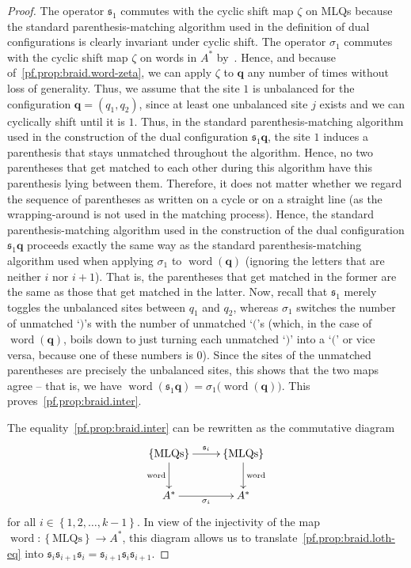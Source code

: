 \documentclass[reqno]{amsart}
\newcommand{\0}{\phantom{c}}
\DeclareMathOperator{\word}{word} %
\newcommand{\qq}{\mathbf{q}}
\newcommand{\fraks}{\mathfrak{s}}
\newcommand{\set}[1]{\left\{ #1 \right\}}
\theoremstyle{plain}
\theoremstyle{definition}
\numberwithin{equation}{section}
\begin{document}
\begin{proof}
The operator $\fraks_1$ commutes with the cyclic shift map $\zeta$ on MLQs because the standard parenthesis-matching algorithm used in the definition of dual configurations is clearly invariant under cyclic shift.
The operator $\sigma_1$ commutes with the cyclic shift map $\zeta$ on words in $A^*$ by~\cite[Prop.~5.6.1]{Loth}.
Hence, and because of~\eqref{pf.prop:braid.word-zeta}, we can apply $\zeta$ to $\qq$ any number of times without loss of generality.
Thus, we assume that the site $1$ is unbalanced for the configuration $\qq = (q_1, q_2)$, since at least one unbalanced site $j$ exists and we can cyclically shift until it is $1$.
Thus, in the standard parenthesis-matching algorithm used in the construction of the dual configuration $\fraks_1 \qq$, the site $1$ induces a parenthesis that stays unmatched throughout the algorithm.
Hence, no two parentheses that get matched to each other during this algorithm have this parenthesis lying between them.
Therefore, it does not matter whether we regard the sequence of parentheses as written on a cycle or on a straight line (as the wrapping-around is not used in the matching process).
Hence, the standard parenthesis-matching algorithm used in the construction of the dual configuration $\fraks_1 \qq$ proceeds exactly the same way as the standard parenthesis-matching algorithm used when applying $\sigma_1$ to $\word(\qq)$ (ignoring the letters that are neither $i$ nor $i+1$). That is, the parentheses that get matched in the former are the same as those that get matched in the latter.
Now, recall that $\fraks_1$ merely toggles the unbalanced sites between $q_1$ and $q_2$, whereas $\sigma_1$ switches the number of unmatched `$)$'s with the number of unmatched `$($'s (which, in the case of $\word(\qq)$, boils down to just turning each unmatched `$)$' into a `$($' or vice versa, because one of these numbers is $0$).
Since the sites of the unmatched parentheses are precisely the unbalanced sites, this shows that the two maps agree -- that is, we have $\word(\fraks_1 \qq) = \sigma_1\bigl( \word(\qq) \bigr)$.
This proves~\eqref{pf.prop:braid.inter}.

The equality~\eqref{pf.prop:braid.inter} can be rewritten as the
commutative diagram
\[
\xymatrix{
 \set{\text{MLQs}} \ar[r]^{\fraks_i} \ar[d]_{\word} & \set{\text{MLQs}} \ar[d]^{\word} \\
 A^* \ar[r]_{\sigma_i} & A^*
}
\]
for all $i \in \set{1, 2, \dotsc, k-1}$.
In view of the injectivity of the map $\word \colon \set{\text{MLQs}} \to A^*$,
this diagram allows us to translate~\eqref{pf.prop:braid.loth-eq} into
$\fraks_i \fraks_{i+1} \fraks_i = \fraks_{i+1} \fraks_i \fraks_{i+1}$.
\end{proof}
\end{document}
